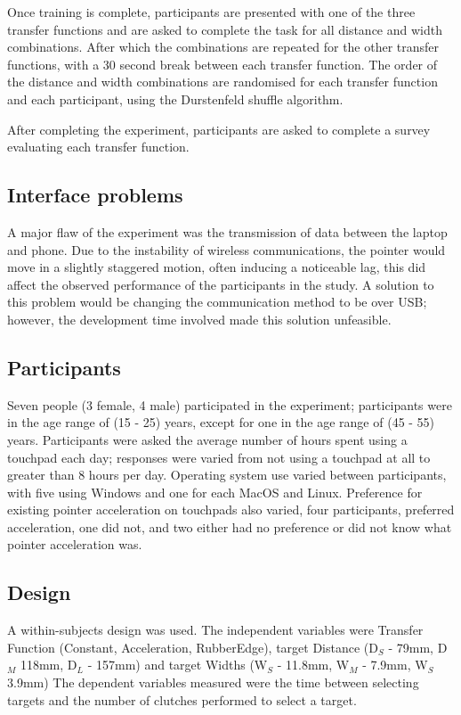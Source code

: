 Once training is complete, participants are presented with one of the three transfer functions and are asked to complete the task for all distance and width combinations. After which the combinations are repeated for the other transfer functions, with a 30 second break between each transfer function. The order of the distance and width combinations are randomised for each transfer function and each participant, using the Durstenfeld shuffle algorithm.

After completing the experiment, participants are asked to complete a survey evaluating each transfer function.

\subsection{Interface problems}\label{section:interface_problems}
A major flaw of the experiment was the transmission of data between the laptop and phone. Due to the instability of wireless communications, the pointer would move in a slightly staggered motion, often inducing a noticeable lag, this did affect the observed performance of the participants in the study. A solution to this problem would be changing the communication method to be over USB; however, the development time involved made this solution unfeasible.

\subsection{Participants}
Seven people (3 female, 4 male) participated in the experiment; participants were in the age range of (15 - 25) years, except for one in the age range of (45 - 55) years. Participants were asked the average number of hours spent using a touchpad each day; responses were varied from not using a touchpad at all to greater than 8 hours per day. Operating system use varied between participants, with five using Windows and one for each MacOS and Linux. Preference for existing pointer acceleration on touchpads also varied, four participants, preferred acceleration, one did not, and two either had no preference or did not know what pointer acceleration was.

\subsection{Design}
A within-subjects design was used. The independent variables were Transfer Function (Constant, Acceleration, RubberEdge), target Distance (D$_S$ - 79mm, D$_M$ 118mm, D$_L$ - 157mm) and target Widths (W$_S$ - 11.8mm, W$_M$ - 7.9mm, W$_S$ 3.9mm) The dependent variables measured were the time between selecting targets and the number of clutches performed to select a target.

